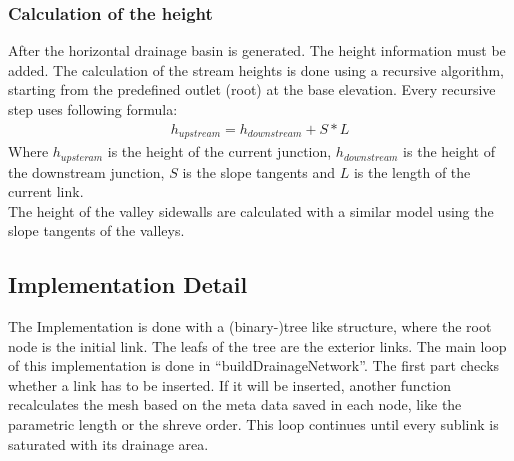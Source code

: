 \documentclass[11pt,a4paper]{article}
\begin{document}
\subsubsection{Calculation of the height}
After the horizontal drainage basin is generated. The height information must be added.
The calculation of the stream heights is done using a recursive algorithm, starting from the predefined outlet (root) at the base elevation. 
Every recursive step uses following formula:
\begin{align}
h_{upstream} = h_{downstream} + S * L
\end{align}
Where $h_{upsteram}$ is the height of the current junction, $h_{downstream}$ is the height of the downstream junction, $S$ is the slope tangents and $L$ is the length of the current link.\\
The height of the valley sidewalls are calculated with a similar model using the slope tangents of the valleys. 

\subsection{Implementation Detail}
The Implementation is done with a (binary-)tree like structure, where the root
node is the initial link. The leafs of the tree are the exterior links.
The main loop of this implementation is done in ``buildDrainageNetwork''.
The first part checks whether a link has to be inserted. If it will be inserted,
another function recalculates the mesh based on the meta data saved in each
node, like the parametric length or the shreve order.
This loop continues until every sublink is saturated with its drainage area.

\newpage


\end{document}
